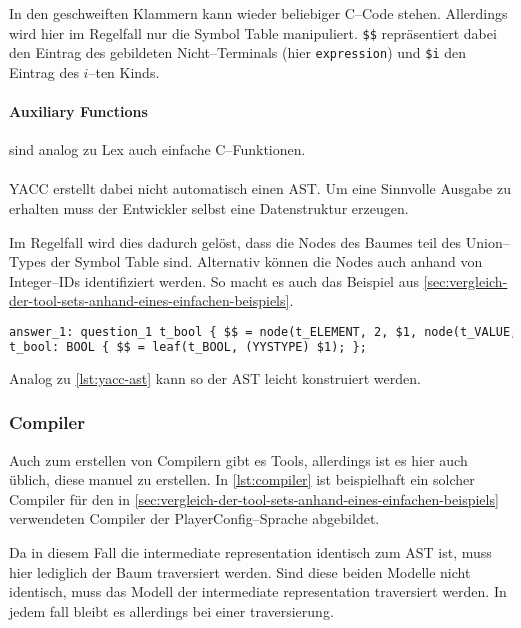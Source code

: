 In den geschweiften Klammern kann wieder beliebiger C--Code stehen.
Allerdings wird hier im Regelfall nur die Symbol Table manipuliert.
\verb|$$| repräsentiert dabei den Eintrag des gebildeten Nicht--Terminals (hier \verb|expression|) und \verb|$i| den Eintrag des $i$--ten Kinds.

\paragraph{Auxiliary Functions} sind analog zu Lex auch einfache C--Funktionen.

\paragraph*{}
\ac{YACC} erstellt dabei nicht automatisch einen \ac{AST}.
Um eine Sinnvolle Ausgabe zu erhalten muss der Entwickler selbst eine Datenstruktur erzeugen.

Im Regelfall wird dies dadurch gelöst, dass die Nodes des Baumes teil des Union--Types der Symbol Table sind.
Alternativ können die Nodes auch anhand von Integer--IDs identifiziert werden.
So macht es auch das Beispiel aus \autoref{sec:vergleich-der-tool-sets-anhand-eines-einfachen-beispiels}.
\begin{lstlisting}[label={lst:yacc-ast},caption={\acs{YACC} \acs{AST}},language=yacc]
answer_1: question_1 t_bool { $$ = node(t_ELEMENT, 2, $1, node(t_VALUE, 1, $2)); };
t_bool: BOOL { $$ = leaf(t_BOOL, (YYSTYPE) $1); };
\end{lstlisting}
Analog zu \autoref{lst:yacc-ast} kann so der \ac{AST} leicht konstruiert werden.

\subsubsection{Compiler}
Auch zum erstellen von Compilern gibt es Tools, allerdings ist es hier auch üblich, diese manuel zu erstellen.
In \autoref{lst:compiler} ist beispielhaft ein solcher Compiler für den in \autoref{sec:vergleich-der-tool-sets-anhand-eines-einfachen-beispiels} verwendeten Compiler der PlayerConfig--Sprache abgebildet.

Da in diesem Fall die intermediate representation identisch zum \ac{AST} ist, muss hier lediglich der Baum traversiert werden.
Sind diese beiden Modelle nicht identisch, muss das Modell der intermediate representation traversiert werden.
In jedem fall bleibt es allerdings bei einer traversierung.

